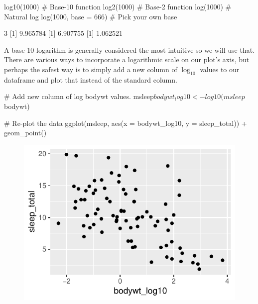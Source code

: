 \begin{inR}
log10(1000) # Base-10 function
log2(1000) # Base-2 function
log(1000) # Natural log
log(1000, base = 666) # Pick your own base
\end{inR}
\begin{outR}
[1] 3
[1] 9.965784
[1] 6.907755
[1] 1.062521
\end{outR}

A base-10 logarithm is generally considered the most intuitive so we will use that. There are various ways to incorporate a logarithmic scale on our plot's axis, but perhaps the safest way is to simply add a new column of $\log_{10}$ values to our dataframe and plot that instead of the standard  column.

\begin{inR}
# Add new column of log bodywt values.
msleep$bodywt_log10 <- log10(msleep$bodywt)

# Re-plot the data
ggplot(msleep, aes(x = bodywt_log10, y = sleep_total)) +
  geom_point()
\end{inR}

\vspace{2em}

\begin{figure}[h]
\includegraphics[scale = 0.75]{graphics/ch2Figs/ggEx_3.pdf}
\label{fig:ggEx_3.pdf}
\end{figure}

